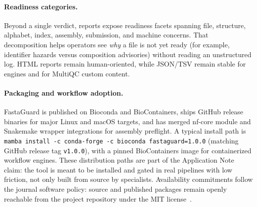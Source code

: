 \documentclass[11pt,a4paper]{article}
\begin{document}
\paragraph{Readiness categories.}
Beyond a single verdict, reports expose readiness facets spanning file,
structure, alphabet, index, assembly, submission, and machine concerns.
That decomposition helps operators see \emph{why} a file is not yet ready
(for example, identifier hazards versus composition advisories) without reading
an unstructured log.
HTML reports remain human-oriented, while JSON/TSV remain stable for engines
and for MultiQC custom content.

\paragraph{Packaging and workflow adoption.}
FastaGuard is published on Bioconda and BioContainers, ships GitHub release
binaries for major Linux and macOS targets, and has merged nf-core module and
Snakemake wrapper integrations for assembly preflight.
A typical install path is
\texttt{mamba install -c conda-forge -c bioconda fastaguard=1.0.0}
(matching GitHub release tag \texttt{v1.0.0}), with a pinned BioContainers image
for containerized workflow engines.
These distribution paths are part of the Application Note claim: the tool is
meant to be installed and gated in real pipelines with low friction, not only
built from source by specialists.
Availability commitments follow the journal software policy: source and
published packages remain openly reachable from the project repository under
the MIT license~\citep{fastaguard2026}.
\end{document}
